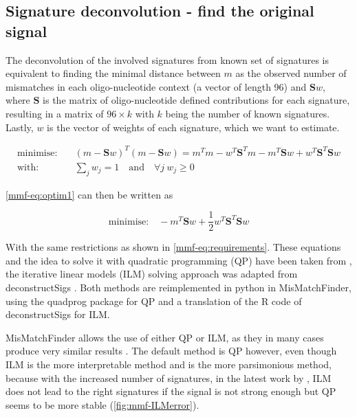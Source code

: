 \subsection[Signature deconvolution]{Signature deconvolution - find the original signal}
\label{mmf-sec:sigDeconv}
The deconvolution of the involved signatures from known set of signatures is equivalent to finding the minimal distance between $m$ as the observed number of mismatches in each oligo-nucleotide context (a vector of length 96) and $\textbf{S}w$, where $\textbf{S}$ is the matrix of oligo-nucleotide defined contributions for each signature, resulting in a matrix of $96 \times k$ with $k$ being the number of known signatures. Lastly, $w$ is the vector of weights of each signature, which we want to estimate. 

\begin{align}
 \text{minimise:} & \quad (m - \textbf{S}w)^T(m - \textbf{S}w)
 = m^Tm - w^T\textbf{S}^Tm - m^T\textbf{S}w + w^T\textbf{S}^T\textbf{S}w \label{mmf-eq:optim1}\\
 \text{with:} & \quad \sum_j w_j = 1 \quad \text{and} \quad \boldsymbol{\forall} j ~ w_j \geq 0 \label{mmf-eq:requirements}
\end{align}
\myequation[\ref{mmf-eq:optim1}]{MisMatchFinder: optimisation for signature weights}
\myequation[\ref{mmf-eq:requirements}]{MisMatchFinder: optimisation function restrictions}

\autoref{mmf-eq:optim1} can then be written as 

\begin{equation}
\text{minimise:} \quad - m^T\textbf{S}w + \frac{1}{2}w^T\textbf{S}^T\textbf{S}w
\label{mmf-eq:optim2}
\end{equation}
\myequation[\ref{mmf-eq:optim2}]{MisMatchFinder: quadratic programming formula}

With the same restrictions as shown in \autoref{mmf-eq:requirements}. These equations and the idea to solve it with quadratic programming (QP) have been taken from \textcite{Lynch2016}, the iterative linear models (ILM) solving approach was adapted from deconstructSigs \cite{Rosenthal2016}. Both methods are reimplemented in python in MisMatchFinder, using the quadprog package \cite{McGibbon2021} for QP and a translation of the R code of deconstructSigs for ILM.

MisMatchFinder allows the use of either QP or ILM, as they in many cases produce very similar results \cite{Lynch2016}. The default method is QP however, even though ILM is the more interpretable method and is the more parsimonious method, because with the increased number of signatures, in the latest work by \textcite{Alexandrov2020}, ILM does not lead to the right signatures if the signal is not strong enough but QP seems to be more stable (\autoref{fig:mmf-ILMerror}).

